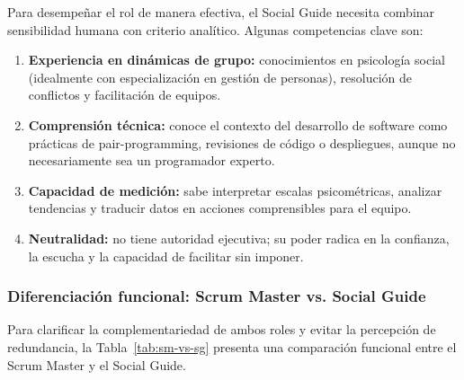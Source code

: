 Para desempeñar el rol de manera efectiva, el Social Guide necesita combinar sensibilidad humana con criterio analítico. Algunas competencias clave son:

\begin{enumerate}
    \item \textbf{Experiencia en dinámicas de grupo:} conocimientos en psicología social (idealmente con especialización en gestión de personas), resolución de conflictos y facilitación de equipos.
    \item \textbf{Comprensión técnica:} conoce el contexto del desarrollo de software como prácticas de \gls{pair-programming}, revisiones de código o despliegues, aunque no necesariamente sea un programador experto.
    \item \textbf{Capacidad de medición:} sabe interpretar escalas psicométricas, analizar tendencias y traducir datos en acciones comprensibles para el equipo.
    \item \textbf{Neutralidad:} no tiene autoridad ejecutiva; su poder radica en la confianza, la escucha y la capacidad de facilitar sin imponer.
\end{enumerate}

\subsubsection{Diferenciación funcional: Scrum Master vs. Social Guide}

Para clarificar la complementariedad de ambos roles y evitar la percepción de redundancia, la Tabla~\ref{tab:sm-vs-sg} presenta una comparación funcional entre el Scrum Master y el Social Guide.

\begingroup
\scriptsize
\renewcommand{\arraystretch}{1.4}
\setlength{\tabcolsep}{4pt}
\setlength{\LTleft}{0pt}
\setlength{\LTright}{0pt}

